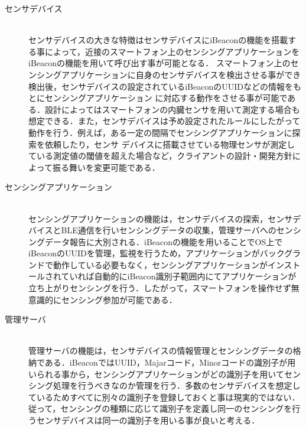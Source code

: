 \documentclass[submit,techrep]{ipsj}
\begin{document}
\begin{description}
 \item[センサデバイス]\mbox{}\\
      センサデバイスの大きな特徴はセンサデバイスにiBeaconの機能を搭載する事によって，近接のスマートフォン上のセンシングアプリケーションをiBeaconの機能を用いて呼び出す事が可能となる．
      スマートフォン上のセンシングアプリケーションに自身のセンサデバイスを検出させる事ができ検出後，センサデバイスの設定されているiBeaconのUUIDなどの情報をもとにセンシングアプリケーション
      に対応する動作をさせる事が可能である．設計によってはスマートフォンの内臓センサを用いて測定する場合も想定できる．また，センサデバイスは予め設定されたルールにしたがって動作を行う．例えば，ある一定の間隔でセンシングアプリケーションに探索を依頼したり，センサ
            デバイスに搭載させている物理センサが測定している測定値の閾値を超えた場合など，クライアントの設計・開発方針によって振る舞いを変更可能である．\\%
 \item[センシングアプリケーション]\mbox{}\\
      センシングアプリケーションの機能は，センサデバイスの探索，センサデバイスとBLE通信を行いセンシングデータの収集，管理サーバへのセンシングデータ報告に大別される．iBeaconの機能を用いることでOS上でiBeaconのUUIDを管理，監視を行うため，アプリケーションがバックグランドで動作している必要もなく，センシングアプリケーションがインストールされていれば自動的にiBeacon識別子範囲内にてアプリケーションが立ち上がりセンシングを行う．したがって，スマートフォンを操作せず無意識的にセンシング参加が可能である．\\
 \item[管理サーバ]\mbox{}\\
      管理サーバの機能は，センサデバイスの情報管理とセンシングデータの格納である．iBeaconではUUID，Majarコード，Minorコードの識別子が用いられる事から，センシングアプリケーションがどの識別子を用いてセンシング処理を行うべきなのか管理を行う．多数のセンサデバイスを想定しているためすべてに別々の識別子を登録しておくと事は現実的ではない．従って，センシングの種類に応じて識別子を定義し同一のセンシングを行うセンサデバイスは同一の識別子を用いる事が良いと考える．
\end{description}



\end{document}

